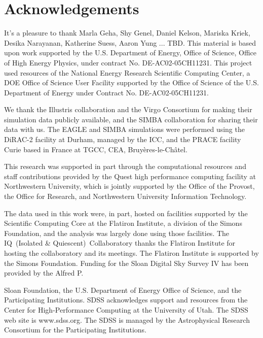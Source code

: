 \documentclass[12pt, letterpaper, preprint, comicneue]{aastex63}
\newcommand{\ch}[1]{#1}%
\begin{document}
\section*{Acknowledgements}
It's a pleasure to thank
    Marla Geha, 
    Shy Genel, 
    Daniel Kelson, 
    Mariska Kriek, 
    Desika Narayanan,
    Katherine Suess, 
    Aaron Yung
    ... 
\ch{TBD}.
This material is based upon work supported by the U.S. Department of Energy,
Office of Science, Office of High Energy Physics, under contract No.
DE-AC02-05CH11231.  This project used resources of the National Energy Research
Scientific Computing Center, a DOE Office of Science User Facility supported by
the Office of Science of the U.S.  Department of Energy under Contract No.
DE-AC02-05CH11231. 

We thank the Illustris collaboration and the Virgo Consortium for making their
simulation data publicly available, and the SIMBA collaboration for sharing
their data with us.
The EAGLE and SIMBA simulations were performed using the DiRAC-2 facility at
Durham, managed by the ICC, and the PRACE facility Curie based in France at
TGCC, CEA, Bruy\`{e}res-le-Ch\^{a}tel.

This research was supported in part through the computational resources and
staff contributions provided by the Quest high performance computing facility
at Northwestern University, which is jointly supported by the Office of the
Provost, the Office for Research, and Northwestern University Information
Technology. 

The data used in this work were, in part, hosted on facilities supported by the
Scientific Computing Core at the Flatiron Institute, a division of the Simons
Foundation, and the analysis was largely done using those facilities.
The IQ~(Isolated \& Quiescent)~Collaboratory thanks the Flatiron Institute for hosting the collaboratory and its meetings. 
The Flatiron Institute is supported by the Simons Foundation.
Funding for the Sloan Digital Sky Survey IV has been provided by the Alfred P.

Sloan Foundation, the U.S. Department of Energy Office of Science, and the
Participating Institutions. SDSS acknowledges support and resources from the
Center for High-Performance Computing at the University of Utah. The SDSS web
site is www.sdss.org.
The SDSS is managed by the Astrophysical Research Consortium for the
Participating Institutions.

\appendix
%
% 
 


 
\end{document}
